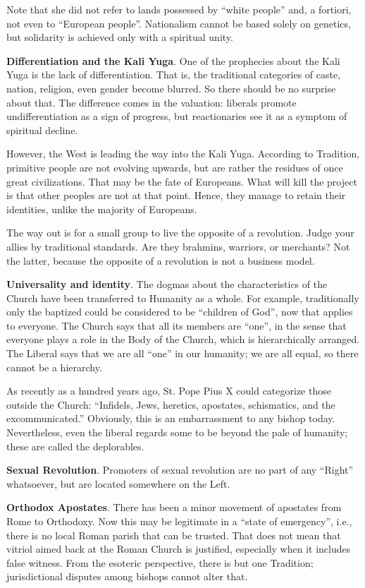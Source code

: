 Note that she did not refer to lands possessed by ``white people'' and, a fortiori, not even to ``European people''. Nationalism cannot be based solely on genetics, but solidarity is achieved only with a spiritual unity.

\textbf{Differentiation and the Kali Yuga}. One of the prophecies about the Kali Yuga is the lack of differentiation. That is, the traditional categories of caste, nation, religion, even gender become blurred. So there should be no surprise about that. The difference comes in the valuation: liberals promote undifferentiation as a sign of progress, but reactionaries see it as a symptom of spiritual decline.

However, the West is leading the way into the Kali Yuga. According to Tradition, primitive people are not evolving upwards, but are rather the residues of once great civilizations. That may be the fate of Europeans. What will kill the project is that other peoples are not at that point. Hence, they manage to retain their identities, unlike the majority of Europeans.

The way out is for a small group to live the opposite of a revolution. Judge your allies by traditional standards. Are they brahmins, warriors, or merchants? Not the latter, because the opposite of a revolution is not a business model.

\textbf{Universality and identity}. The dogmas about the characteristics of the Church have been transferred to Humanity as a whole. For example, traditionally only the baptized could be considered to be ``children of God'', now that applies to everyone. The Church says that all its members are ``one'', in the sense that everyone plays a role in the Body of the Church, which is hierarchically arranged. The Liberal says that we are all ``one'' in our humanity; we are all equal, so there cannot be a hierarchy.

As recently as a hundred years ago, St. Pope Pius X could categorize those outside the Church: ``Infidels, Jews, heretics, apostates, schismatics, and the excommunicated.'' Obviously, this is an embarrassment to any bishop today. Nevertheless, even the liberal regards some to be beyond the pale of humanity; these are called the deplorables.

\textbf{Sexual Revolution}. Promoters of sexual revolution are no part of any ``Right'' whatsoever, but are located somewhere on the Left.

\textbf{Orthodox Apostates}. There has been a minor movement of apostates from Rome to Orthodoxy. Now this may be legitimate in a ``state of emergency'', i.e., there is no local Roman parish that can be trusted. That does not mean that vitriol aimed back at the Roman Church is justified, especially when it includes false witness. From the esoteric perspective, there is but one Tradition; jurisdictional disputes among bishops cannot alter that.


